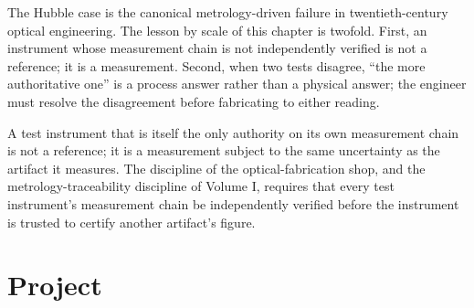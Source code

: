 The Hubble case is the canonical metrology-driven failure in
twentieth-century optical engineering. The lesson by scale of this
chapter is twofold. First, an instrument whose measurement chain is
not independently verified is not a reference; it is a measurement.
Second, when two tests disagree, ``the more authoritative one'' is a
process answer rather than a physical answer; the engineer must
resolve the disagreement before fabricating to either reading.

\begin{principle}
A test instrument that is itself the only authority on its own
measurement chain is not a reference; it is a measurement subject to
the same uncertainty as the artifact it measures. The discipline of
the optical-fabrication shop, and the metrology-traceability
discipline of Volume I, requires that every test instrument's
measurement chain be independently verified before the instrument is
trusted to certify another artifact's figure.
\end{principle}

\section{Project}

